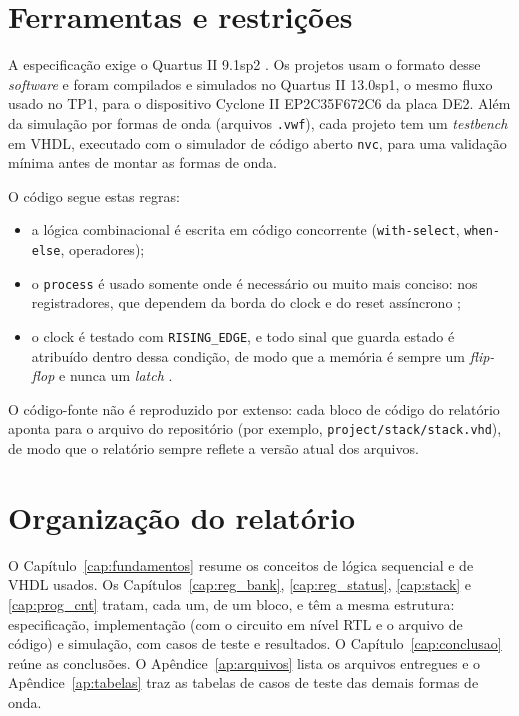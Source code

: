 \section{Ferramentas e restrições}

A especificação exige o Quartus II 9.1sp2 \cite{tp2}. Os projetos usam o formato desse \textit{software} e foram compilados e simulados no Quartus II 13.0sp1, o mesmo fluxo usado no TP1, para o dispositivo Cyclone II EP2C35F672C6 da placa DE2. Além da simulação por formas de onda (arquivos \texttt{.vwf}), cada projeto tem um \textit{testbench} em VHDL, executado com o simulador de código aberto \texttt{nvc}, para uma validação mínima antes de montar as formas de onda.

O código segue estas regras:

\begin{itemize}
  \item a lógica combinacional é escrita em código concorrente (\texttt{with-select}, \texttt{when-else}, operadores);
  \item o \texttt{process} é usado somente onde é necessário ou muito mais conciso: nos registradores, que dependem da borda do clock e do reset assíncrono \cite{aula8};
  \item o clock é testado com \texttt{RISING\_EDGE}, e todo sinal que guarda estado é atribuído dentro dessa condição, de modo que a memória é sempre um \textit{flip-flop} e nunca um \textit{latch} \cite{aula7}.
\end{itemize}

O código-fonte não é reproduzido por extenso: cada bloco de código do relatório aponta para o arquivo do repositório (por exemplo, \texttt{project/stack/stack.vhd}), de modo que o relatório sempre reflete a versão atual dos arquivos.

\section{Organização do relatório}

O Capítulo~\ref{cap:fundamentos} resume os conceitos de lógica sequencial e de VHDL usados. Os Capítulos~\ref{cap:reg_bank}, \ref{cap:reg_status}, \ref{cap:stack} e \ref{cap:prog_cnt} tratam, cada um, de um bloco, e têm a mesma estrutura: especificação, implementação (com o circuito em nível RTL e o arquivo de código) e simulação, com casos de teste e resultados. O Capítulo~\ref{cap:conclusao} reúne as conclusões. O Apêndice~\ref{ap:arquivos} lista os arquivos entregues e o Apêndice~\ref{ap:tabelas} traz as tabelas de casos de teste das demais formas de onda.
